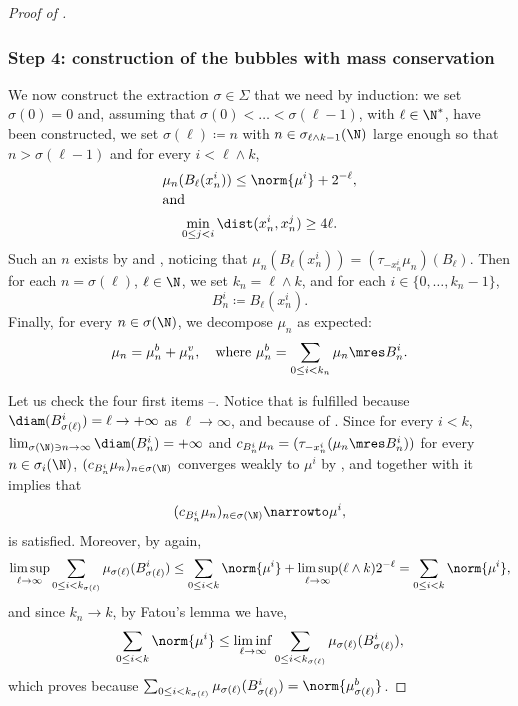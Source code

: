\begin{proof}[Proof of ]
\subsubsection*{Step 4: construction of the bubbles with mass conservation}
We now construct the extraction \(\sigma\in\Sigma\) that we need by induction: we set \(\sigma(0)=0\) and, assuming that \(\sigma(0)<\dots<\sigma(\ell-1)\), with \(\ell\in\N^\ast\), have been constructed, we set \(\sigma(\ell)\coloneqq n\) with \(n\in\sigma_{\ell \wedge k -1}(\N)\) large enough so that $n > \sigma(\ell-1)$ and for every \(i< \ell \wedge k\),\vspace*{-3pt}
\begin{gather}
\mu_n(B_\ell(x^i_n))\le\norm{\mu^i}+2^{-\ell},\label{inductionBubbles1}\\[-3pt]
\shortintertext{and}
\min_{0\le j<i}\dist(x^i_n,x^j_n)\ge 4\ell.\label{inductionBubbles2}
\end{gather}
Such an \(n\) exists by  and , noticing that $\mu_n(B_\ell(x_n^i)) = (\tau_{-x_n^i} \mu_n)(B_\ell)$. Then for each \(n=\sigma(\ell)\), \(\ell\in\N\), we set \(k_n=\ell \wedge k\), and for each \(i\in\{0,\dots,k_n-1\}\),\vspace*{-3pt}
\[
B^i_n\coloneqq B_\ell(x^i_n).
\]
Finally, for every \(n\in\sigma(\N)\), we decompose $\mu_n$ as expected:\vspace*{-3pt}
\[
\mu_n = \mu^b_n + \mu^v_n,\quad \text{where } \mu^b_n = \sum_{0\le i < k_n} \mu_n \mres B_n^i.
\]

Let us check the four first items --. Notice that  is fulfilled because $\diam(B_{\sigma(\ell)}^i) = \ell \to +\infty$ as $\ell\to\infty$, and  because of . Since for every $i<k$, $\lim_{\sigma(\N)\ni n \to\infty}\diam(B_n^i) = +\infty$ and $c_{B_n^i} \mu_n = (\tau_{-x_n^i} (\mu_n\mres B_n^i))$ for every $n \in \sigma_i(\N)$, $(c_{B_n^i} \mu_n)_{n\in\sigma(\N)}$ converges weakly to $\mu^i$ by , and together with  it implies that\vspace*{-3pt}
\[(c_{B_n^i} \mu_n)_{n\in\sigma(\N)} \narrowto \mu^i,\]
\ie {} is satisfied.
Moreover, by  again,\vspace*{-3pt}
\[
\limsup_{\ell\to\infty}\sum_{0\le i<k_{\sigma(\ell)}}\mu_{\sigma(\ell)}(B^i_{\sigma(\ell)})\le \sum_{0\le i<k}\norm{\mu^i}+\limsup_{\ell\to\infty}(\ell \wedge k) 2^{-\ell}=\sum_{0\le i<k}\norm{\mu^i},
\]
and since $k_n \to k$, by Fatou's lemma we have,\vspace*{-3pt}
\[\sum_{0\leq i < k}\norm{\mu^i} \leq \liminf_{\ell\to\infty}\sum_{0\le i<k_{\sigma(\ell)}}\mu_{\sigma(\ell)}(B^i_{\sigma(\ell)}),\]
which proves  because $ \sum_{0\le i<k_{\sigma(\ell)}}\mu_{\sigma(\ell)}(B^i_{\sigma(\ell)}) = \norm{\mu^b_{\sigma(\ell)}}$.


\end{proof}
